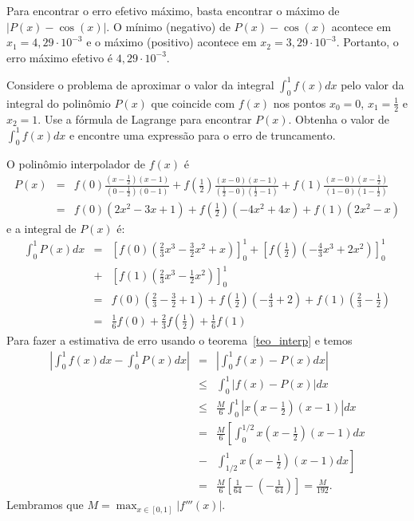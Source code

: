 Para encontrar o erro efetivo máximo, basta encontrar o máximo de $|P(x)-\cos(x)|$. O mínimo (negativo) de $P(x)-\cos(x)$ acontece em $x_1=4,29\cdot 10^{-3}$ e o máximo (positivo) acontece em $x_2=3,29\cdot 10^{-3}$. Portanto, o erro máximo efetivo é $4,29\cdot 10^{-3}$.

\begin{ex}\label{exemp_simpson}
Considere o problema de aproximar o valor da integral $\int_0^1 f(x)dx$ pelo valor da integral do polinômio $P(x)$ que coincide com $f(x)$ nos pontos $x_0=0$, $x_1=\frac{1}{2}$ e $x_2=1$. Use a fórmula de Lagrange para encontrar $P(x)$. Obtenha o valor de $\int_0^1f(x)dx$ e encontre uma expressão para o erro de truncamento.
\end{ex}
O polinômio interpolador de $f(x)$ é
\begin{eqnarray*}
P(x)&=&f(0)\frac{(x-\frac{1}{2})(x-1)}{(0-\frac{1}{2})(0-1)}+f\left(\frac{1}{2}\right)\frac{(x-0)(x-1)}{(\frac{1}{2}-0)(\frac{1}{2}-1)}+f(1)\frac{(x-0)(x-\frac{1}{2})}{(1-0)(1-\frac{1}{2})}\\
&=&   f(0)(2x^2-3x+1)+f\left(\frac{1}{2}\right)(-4x^2+4x)+f(1)(2x^2-x)
\end{eqnarray*}
e a integral de $P(x)$ é:
\begin{eqnarray*}
\int_0^1 P(x)dx &=& \left[f(0)\left(\frac{2}{3}x^3 - \frac{3}{2}x^2+x\right)\right]_0^1 + \left[f\left(\frac{1}{2}\right)\left(-\frac{4}{3}x^3+2x^2\right)\right]_0^1 \\
&+& \left[f(1)\left(\frac{2}{3}x^3-\frac{1}{2}x^2\right)\right]_0^1\\
&=& f(0)\left(\frac{2}{3}-\frac{3}{2}+1\right)+f\left(\frac{1}{2}\right)\left(-\frac{4}{3}+2\right)+f(1)\left(\frac{2}{3}-\frac{1}{2}\right)\\
&=& \frac{1}{6}f(0)+\frac{2}{3}f\left(\frac{1}{2}\right)+\frac{1}{6}f(1)
\end{eqnarray*}
Para fazer a estimativa de erro usando o teorema~\ref{teo_interp} e temos
\begin{eqnarray*}
\left|\int_0^1f(x)dx-\int_0^1 P(x)dx\right|&=&\left|\int_0^1f(x)- P(x)dx\right|\\
&\leq&\int_0^1|f(x)- P(x)|dx\\
&\leq& \frac{M}{6}  \int_0^1\left|x\left(x-\frac{1}{2}\right)(x-1)\right|dx\\
&=& \frac{M}{6}  \left[\int_0^{1/2}x\left(x-\frac{1}{2}\right)(x-1)dx\right.\\
&-&\left.\int_{1/2}^1x\left(x-\frac{1}{2}\right)(x-1)dx\right]\\
&=& \frac{M}{6}  \left[\frac{1}{64}-\left(-\frac{1}{64}\right)\right]=\frac{M}{192}.
\end{eqnarray*}
Lembramos que $M=\max_{x\in[0,1]}|f'''(x)|$.

